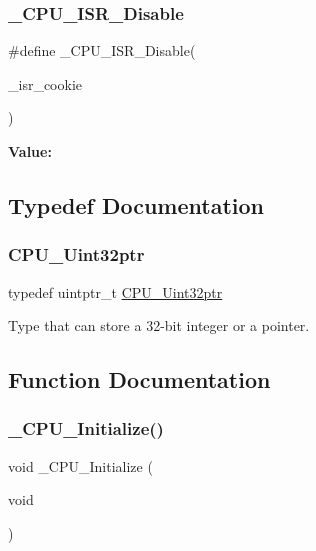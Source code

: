 \subsubsection{\texorpdfstring{\_CPU\_ISR\_Disable}{\_CPU\_ISR\_Disable}}
{\footnotesize\ttfamily \#define \+\_\+\+C\+P\+U\+\_\+\+I\+S\+R\+\_\+\+Disable(\begin{DoxyParamCaption}\item[{}]{\+\_\+isr\+\_\+cookie }\end{DoxyParamCaption})}

{\bfseries Value\+:}
\begin{DoxyCode}{0}
\DoxyCodeLine{\textcolor{keywordflow}{do} \{ \(\backslash\)}

\end{DoxyCode}


\subsection{Typedef Documentation}
\mbox{\label{group__RTEMSScoreCPUARM_ga9fca17f81f850e128fcc8ed5b87ff2ab}} 
\subsubsection{\texorpdfstring{CPU\_Uint32ptr}{CPU\_Uint32ptr}}
{\footnotesize\ttfamily typedef uintptr\+\_\+t \mbox{\hyperlink{group__RTEMSScoreCPUARM_ga9fca17f81f850e128fcc8ed5b87ff2ab}{C\+P\+U\+\_\+\+Uint32ptr}}}

Type that can store a 32-\/bit integer or a pointer. 

\subsection{Function Documentation}
\mbox{\label{group__RTEMSScoreCPUARM_ga869484e3d851b032fd826c69ff21fc72}} 
\subsubsection{\texorpdfstring{\_CPU\_Initialize()}{\_CPU\_Initialize()}}
{\footnotesize\ttfamily void \+\_\+\+C\+P\+U\+\_\+\+Initialize (\begin{DoxyParamCaption}\item[{void}]{ }\end{DoxyParamCaption})}



